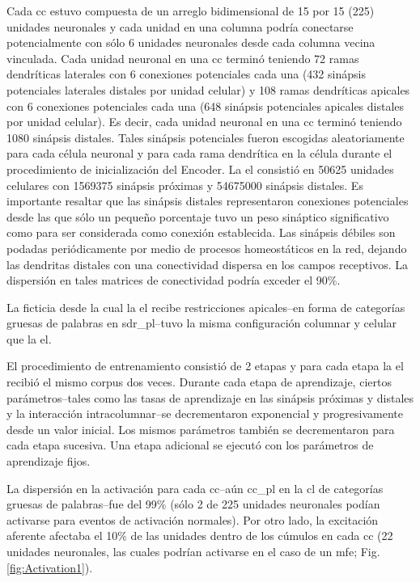 {Cada \gls{cc} estuvo compuesta de un arreglo bidimensional de 15 por 15 (225) unidades neuronales y cada unidad en una columna podría conectarse potencialmente con sólo 6 unidades neuronales desde cada columna vecina vinculada.
Cada unidad neuronal en una \gls{cc} terminó teniendo 72 ramas dendríticas laterales con 6 conexiones potenciales cada una (432 sinápsis potenciales laterales distales por unidad celular) y 108 ramas dendríticas apicales con 6 conexiones potenciales cada una (648 sinápsis potenciales apicales distales por unidad celular).
Es decir, cada unidad neuronal en una \gls{cc} terminó teniendo 1080 sinápsis distales.
Tales sinápsis potenciales fueron escogidas aleatoriamente para cada célula neuronal y para cada rama dendrítica en la célula durante el procedimiento de inicialización del Encoder.
La \gls{el} consistió en 50625 unidades celulares con 1569375 sinápsis próximas y 54675000 sinápsis distales.
Es importante resaltar que las sinápsis distales representaron conexiones potenciales desde las que sólo un pequeño porcentaje tuvo un peso sináptico significativo como para ser considerada como conexión establecida.
Las sinápsis débiles son podadas periódicamente por medio de procesos homeostáticos en la red, dejando las dendritas distales con una conectividad dispersa en los campos receptivos. La dispersión en tales matrices de conectividad podría exceder el 90\%.

La  ficticia desde la cual la \gls{el} recibe restricciones apicales--en forma de categorías gruesas de palabras en \gls{sdr_pl}--tuvo la misma configuración columnar y celular que la \gls{el}.

El procedimiento de entrenamiento consistió de 2 etapas y para cada etapa la \gls{el} recibió el mismo corpus dos veces.
Durante cada etapa de aprendizaje, ciertos parámetros--tales como las tasas de aprendizaje en las sinápsis próximas y distales y la interacción intracolumnar--se decrementaron exponencial y progresivamente desde un valor inicial.
Los mismos parámetros también se decrementaron para cada etapa sucesiva.
Una etapa adicional se ejecutó con los parámetros de aprendizaje fijos.

La dispersión en la activación para cada \gls{cc}--aún \gls{cc_pl} en la \gls{cl} de categorías gruesas de palabras--fue del 99\% (sólo 2 de 225 unidades neuronales podían activarse para eventos de activación normales).
Por otro lado, la excitación aferente afectaba el 10\% de las unidades dentro de los cúmulos en cada \gls{cc} (22 unidades neuronales, las cuales podrían activarse en el caso de un \gls{mfe}; Fig. \ref{fig:Activation1}).

}

